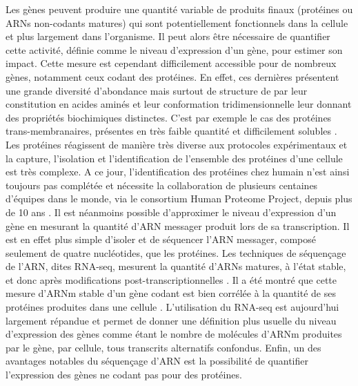 Les gènes peuvent produire une quantité variable de produits finaux (protéines ou \acrshort{ARN}s non-codants matures) qui sont potentiellement fonctionnels dans la cellule et plus largement dans l’organisme. Il peut alors être nécessaire de quantifier cette activité, définie comme le niveau d'expression d’un gène, pour estimer son impact. Cette mesure est cependant difficilement accessible pour de nombreux gènes, notamment ceux codant des protéines. En effet, ces dernières présentent une grande diversité d’abondance mais surtout de structure de par leur constitution en acides aminés et leur conformation tridimensionnelle leur donnant des propriétés biochimiques distinctes. C’est par exemple le cas des protéines trans-membranaires, présentes en très faible quantité et difficilement solubles \citep{vuckovic_membrane_2013}. Les protéines réagissent de manière très diverse aux protocoles expérimentaux et la capture, l’isolation et l’identification de l’ensemble des protéines d’une cellule est très complexe. A ce jour, l’identification des protéines chez humain n’est ainsi toujours pas complétée et nécessite la collaboration de plusieurs centaines d'équipes dans le monde, via le consortium Human Proteome Project, depuis plus de 10 ans \citep{adhikari_high-stringency_2020}. Il est néanmoins possible d’approximer le niveau d’expression d’un gène en mesurant la quantité d’\acrshort{ARN} messager produit lors de sa transcription. Il est en effet plus simple d’isoler et de séquencer l’\acrshort{ARN} messager, composé seulement de quatre nucléotides, que les protéines. Les techniques de séquençage de l’\acrshort{ARN}, dites \acrshort{RNA-seq}, mesurent la quantité d’\acrshort{ARN}s matures, à l’état stable, et donc après modifications post-transcriptionnelles \citep{chu_rna_2012}. Il a été montré que cette mesure d’\acrshort{ARNm} stable d’un gène codant est bien corrélée à la quantité de ses protéines produites dans une cellule \citep{edfors_gene-specific_2016}. L’utilisation du \acrshort{RNA-seq} est aujourd’hui largement répandue et permet de donner une définition plus usuelle du niveau d’expression des gènes comme étant le nombre de molécules d’\acrshort{ARNm} produites par le gène, par cellule, tous transcrits alternatifs confondus. Enfin, un des avantages notables du séquençage d’\acrshort{ARN} est la possibilité de quantifier l’expression des gènes ne codant pas pour des protéines. \\

